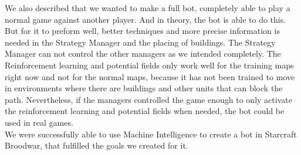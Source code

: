 We also described that we wanted to make a full bot, completely able to play a normal game against another player. And in theory, the bot is able to do this. But for it to preform well, better techniques and more precise information is needed in the Strategy Manager and the placing of buildings. The Strategy Manager can not control the other managers as we intended completely. The Reinforcement learning and potential fields only work well for the training maps right now and not for the normal maps, because it has not been trained to move in environments where there are buildings and other units that can block the path. Nevertheless, if the managers controlled the game enough to only activate the reinforcement learning and potential fields when needed, the bot could be used in real games.\\

We were successfully able to use Machine Intelligence to create a bot in Starcraft Broodwar, that fulfilled the goals we created for it.


